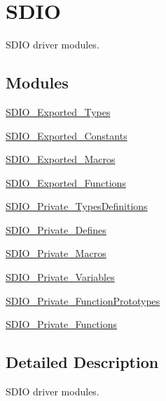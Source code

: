\hypertarget{group___s_d_i_o}{}\section{S\+D\+IO}
\label{group___s_d_i_o}


S\+D\+IO driver modules.  


\subsection*{Modules}
\begin{DoxyCompactItemize}
\item 
\hyperlink{group___s_d_i_o___exported___types}{S\+D\+I\+O\+\_\+\+Exported\+\_\+\+Types}
\item 
\hyperlink{group___s_d_i_o___exported___constants}{S\+D\+I\+O\+\_\+\+Exported\+\_\+\+Constants}
\item 
\hyperlink{group___s_d_i_o___exported___macros}{S\+D\+I\+O\+\_\+\+Exported\+\_\+\+Macros}
\item 
\hyperlink{group___s_d_i_o___exported___functions}{S\+D\+I\+O\+\_\+\+Exported\+\_\+\+Functions}
\item 
\hyperlink{group___s_d_i_o___private___types_definitions}{S\+D\+I\+O\+\_\+\+Private\+\_\+\+Types\+Definitions}
\item 
\hyperlink{group___s_d_i_o___private___defines}{S\+D\+I\+O\+\_\+\+Private\+\_\+\+Defines}
\item 
\hyperlink{group___s_d_i_o___private___macros}{S\+D\+I\+O\+\_\+\+Private\+\_\+\+Macros}
\item 
\hyperlink{group___s_d_i_o___private___variables}{S\+D\+I\+O\+\_\+\+Private\+\_\+\+Variables}
\item 
\hyperlink{group___s_d_i_o___private___function_prototypes}{S\+D\+I\+O\+\_\+\+Private\+\_\+\+Function\+Prototypes}
\item 
\hyperlink{group___s_d_i_o___private___functions}{S\+D\+I\+O\+\_\+\+Private\+\_\+\+Functions}
\end{DoxyCompactItemize}


\subsection{Detailed Description}
S\+D\+IO driver modules. 

